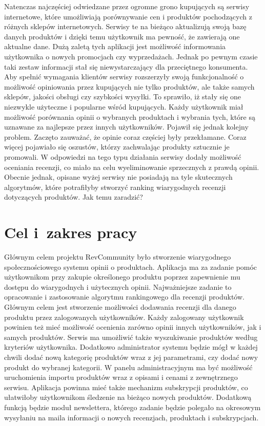 Natenczas najczęściej odwiedzane przez ogromne grono kupujących są serwisy internetowe, które umożliwiają porównywanie cen i produktów pochodzących z różnych sklepów internetowych. Serwisy te na bieżąco aktualizują swoją bazę danych produktów i dzięki temu użytkownik ma pewność, że zawierają one aktualne dane. Dużą zaletą tych aplikacji jest możliwość informowania użytkownika o nowych promocjach czy wyprzedażach. Jednak po pewnym czasie taki zestaw informacji stał się niewystarczający dla przeciętnego konsumenta. Aby spełnić wymagania klientów serwisy rozszerzyły swoją funkcjonalność o możliwość opiniowania przez kupujących nie tylko produktów, ale także samych sklepów, jakości obsługi czy szybkości wysyłki. To sprawiło, iż stały się one niezwykle użyteczne i popularne wśród kupujących. Każdy użytkownik miał możliwość porównania opinii o wybranych produktach i wybrania tych, które są uznawane za najlepsze przez innych użytkowników. Pojawił się jednak kolejny problem. Zaczęto zauważać, że opinie coraz częściej były przekłamane. Coraz więcej pojawiało się oszustów, którzy zachwalając produkty sztucznie je promowali. W odpowiedzi na tego typu działania serwisy dodały możliwość oceniania recenzji, co miało na celu wyeliminowanie sprzecznych z prawdą opinii. Obecnie jednak, opisane wyżej serwisy nie posiadają na tyle skutecznych algorytmów, które potrafiłyby stworzyć ranking wiarygodnych recenzji dotyczących produktów. Jak temu zaradzić?  
 


\section{Cel i~zakres pracy}
Głównym celem projektu RevCommunity było stworzenie wiarygodnego społecznościowego systemu  opinii o produktach. Aplikacja ma za zadanie pomóc użytkownikom przy zakupie określonego produktu poprzez zapewnienie mu dostępu do wiarygodnych i użytecznych opinii. Najważniejsze zadanie to opracowanie i zastosowanie algorytmu rankingowego dla recenzji produktów. Głównym celem jest stworzenie możliwości dodawania recenzji dla danego produktu przez zalogowanych użytkowników. Każdy zalogowany użytkownik powinien też mieć możliwość ocenienia zarówno opinii innych użytkowników, jak i samych produktów. Serwis ma umożliwić także wyszukiwanie produktów według kryteriów użytkownika. Dodatkowo administrator systemu będzie mógł w każdej chwili dodać nową kategorię produktów wraz z jej parametrami, czy dodać nowy produkt do wybranej kategorii. W panelu administracyjnym ma być możliwość uruchomienia importu produktów wraz z opisami i cenami z zewnętrznego serwisu. Aplikacja powinna mieć także mechanizm subskrypcji produktów, co ułatwiłoby użytkownikom śledzenie na bieżąco nowych produktów. Dodatkową funkcją będzie moduł newslettera, którego zadanie będzie polegało na okresowym wysyłaniu na maila informacji o nowych recenzjach, produktach i subskrypcjach. 

